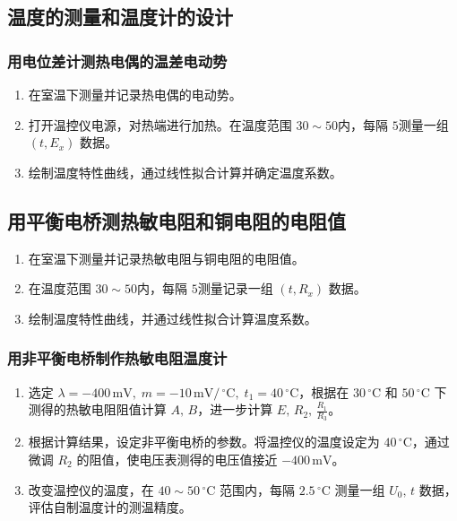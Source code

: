 \documentclass[UTF-8,twoside,cs4size]{ctexart}
\begin{document}
\subsection{温度的测量和温度计的设计}
\subsubsection{用电位差计测热电偶的温差电动势}

\begin{enumerate}
    \item 在室温下测量并记录热电偶的电动势。
    
    \item 打开温控仪电源，对热端进行加热。在温度范围 $30 \sim 50 $\textcelsius 内，每隔 $5$\textcelsius 测量一组 $ (t, E_x) $ 数据。
    
    \item 绘制温度特性曲线，通过线性拟合计算并确定温度系数。
\end{enumerate}
\subsection{用平衡电桥测热敏电阻和铜电阻的电阻值}

\begin{enumerate}
    \item 在室温下测量并记录热敏电阻与铜电阻的电阻值。
    
    \item 在温度范围 $30 \sim 50 $\textcelsius 内，每隔 $5$\textcelsius 测量记录一组 $ (t, R_x) $ 数据。
    
    \item 绘制温度特性曲线，并通过线性拟合计算温度系数。
\end{enumerate}

\subsubsection{用非平衡电桥制作热敏电阻温度计}
\begin{enumerate}
    \item 选定 $\lambda = -400\,\mathrm{mV}, \; m = -10\,\mathrm{mV/\, ^\circ \mathrm{C}}, \; t_1 = 40 \, ^\circ \mathrm{C}$，根据在 $30 \, ^\circ \mathrm{C}$ 和 $50 \, ^\circ \mathrm{C}$ 下测得的热敏电阻阻值计算 $A, \, B$，进一步计算 $E, \, R_2, \, \frac{R_1}{R_3}$。
    
    \item 根据计算结果，设定非平衡电桥的参数。将温控仪的温度设定为 $40 \, ^\circ \mathrm{C}$，通过微调 $R_2$ 的阻值，使电压表测得的电压值接近 $-400\,\mathrm{mV}$。
    
    \item 改变温控仪的温度，在 $40 \sim 50 \, ^\circ \mathrm{C}$ 范围内，每隔 $2.5 \, ^\circ \mathrm{C}$ 测量一组 $U_0, \, t$ 数据，评估自制温度计的测温精度。
\end{enumerate}
\end{document}
